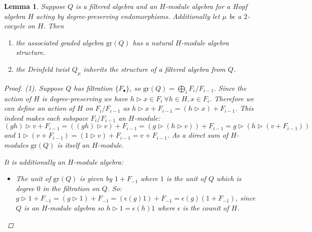 \documentclass[10pt]{article}
\newcommand{\rt}{\xrightarrow{}}
\newcommand{\gr}{\text{gr}}
\newtheorem{lemma}{Lemma}[section]
\theoremstyle{definition}
\begin{document}
\begin{lemma}\label{ass_is_module_algebra} Suppose $Q$ is a filtered algebra and an $H$-module algebra for a Hopf algebra $H$ acting by degree-preserving endomorphisms. Additionally let $\mu$ be a $2$-cocycle on $H$. Then 
\begin{enumerate}  
  \item the associated graded algebra $\gr(Q)$ has a natural $H$-module algebra structure.
  \item the Drinfeld twist $Q_\mu$ inherits the structure of a filtered algebra from $Q$.
\end{enumerate}
\begin{proof}
(1). Suppose $Q$ has filtration $\{F_\bullet\}$, so $\gr(Q)=\bigoplus_i F_i/F_{i-1}$. Since the action of $H$ is degree-preserving we have $h\rhd x\in F_i\ \forall h\in H,x \in F_i$. Therefore we can define an action of $H$ on $F_i/F_{i-1}$ as $h\rhd x+F_{i-1}=(h\rhd x)+F_{i-1}$. This indeed makes each subspace $F_i/F_{i-1}$ an $H$-module: $(gh)\rhd v+F_{i-1}=((gh) \rhd v)+F_{i-1}=(g\rhd(h\rhd v))+F_{i-1}=g\rhd (h\rhd (v+F_{i-1}))$ and $1\rhd (v+F_{i-1})=(1\rhd v)+F_{i-1}=v+F_{i-1}$. As a direct sum of $H$-modules $\gr(Q)$ is itself an $H$-module.
\iffalse
Let us denote the filtration on $Q$ as $\{F_\bullet\}$, and the action of $H$ on $Q$ as the linear map $\rhd:H\otimes Q\rt Q$. By the degree-preserving assumption we have for each Note $\rhd(h,-):Q\rt Q$ are linear maps for each $h\in H$. These are additionally filtered linear maps by the fact that the action is degree-preserving, i.e. $\rhd(h,F_i)\subseteq F_i$. So by the discussion above, we get induced linear maps $\gr(\rhd(h,-)):\gr(Q)\rt \gr(Q)$ for each $h\in H$, defined as $\gr(\rhd(h,-)):=\bigoplus_{i\geq 0}\gr(\rhd(h,-))^i$ where
$$\gr(\rhd(h,-))^i:F_i/F_{i-1}\rt F_i/F_{i-1}, v+F_{i-1}\mapsto (h\rhd v)+F_{i-1}$$
So we define the action of $H$ on $F_i/F_{i-1}$ as follows, 
$$h\rhd v+F_{i-1}:=\gr(\rhd(h,-))(v+F_{i-1})=(h\rhd v)+F_{i-1}$$
and extend this action linearly to the rest of $\gr(Q)$. %
We check this firstly makes $\gr(Q)$ an $H$-module.
\begin{itemize}
  \item $gh\rhd (v+F_{i-1})=(gh \rhd v)+F_{i-1}=g\rhd(h\rhd v)+F_{i-1}=g\rhd (h\rhd (v+F_{i-1}))$
  
  \item $1\rhd (v+F_{i-1})=(1\rhd v)+F_{i-1}=v+F_{i-1}$
\end{itemize}
\fi
It is additionally an $H$-module algebra:
\begin{itemize}
  \item The unit of $\gr(Q)$ is given by $1+F_{-1}$ where $1$ is the unit of $Q$ which is degree $0$ in the filtration on $Q$. So: $g\rhd 1+F_{-1}=(g\rhd 1)+F_{-1}=(\epsilon(g)1)+F_{-1}=\epsilon(g)(1+F_{-1})$, since $Q$ is an $H$-module algebra so $h\rhd 1=\epsilon(h)1$ where $\epsilon$ is the counit of $H$.
  

\end{itemize}
\end{proof}
\end{lemma}
\end{document}

